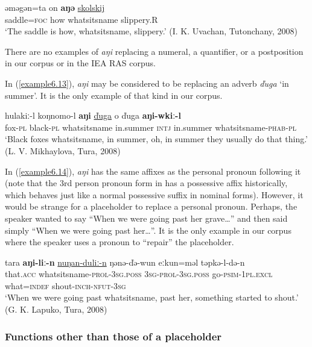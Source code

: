 \documentclass[output=paper,colorlinks,citecolor=brown]{langscibook}
\begin{document}
\ea
    \label{example6.12}
    \gll əməgən=ta	on	\textbf{aŋə}	\uline{skolskij}\\
    saddle=\textsc{foc}	how	whatsitsname	slippery.R\\
    \glt `The saddle is how, whatsitsname, slippery.' (I. K. Uvachan, Tutonchany, 2008)\\
    \z

There are no examples of \textit{aŋi} replacing a numeral, a quantifier, or a postposition in our corpus or in the IEA RAS corpus.

In (\ref{example6.13}), \textit{aŋi} may be considered to be replacing an adverb \textit{ďuga} ‘in summer’. It is the only example of that kind in our corpus.

\ea
    \label{example6.13}
    \gll hulakiː-l	koŋnomo-l	\textbf{aŋi}	\uline{ďuga}	o	ďuga    \textbf{aŋi-wkiː-l}\\
    fox-\textsc{pl}	black-\textsc{pl}	whatsitsname	in.summer	\textsc{intj}	in.summer   whatsitsname-\textsc{phab}-\textsc{pl}\\
    \glt `Black foxes whatsitsname, in summer, oh, in summer they usually do that thing.' (L. V. Mikhaylova, Tura, 2008)\\
    \z

In (\ref{example6.14}), \textit{aŋi} has the same affixes as the personal pronoun following it (note that the 3rd person pronoun form in  has a possessive affix historically, which behaves just like a normal possessive suffix in nominal forms). However, it would be strange for a placeholder to replace a personal pronoun. Perhaps, the speaker wanted to say “When we were going past her grave…” and then said simply “When we were going past her…”. It is the only example in our corpus where the speaker uses a pronoun to “repair” the placeholder.

\ea
    \label{example6.14}
    \gll tara	\textbf{aŋi-liː-n}	\uline{nuŋan-duliː-n}	ŋənə-ďə-wun eːkun=məl	təpkə-l-də-n\\
    that.\textsc{acc}	whatsitsname-\textsc{prol}-\textsc{3sg.poss}	3\textsc{sg}-\textsc{prol}-\textsc{3sg.poss}	go-\textsc{psim}-1\textsc{pl.excl} what=\textsc{indef}	shout-\textsc{inch}-\textsc{nfut}-3\textsc{sg}\\
    \glt `When we were going past whatsitsname, past her, something started to shout.' (G. K. Lapuko, Tura, 2008)\\
    \z

\subsubsection{Functions other than those of a placeholder}
\end{document}
